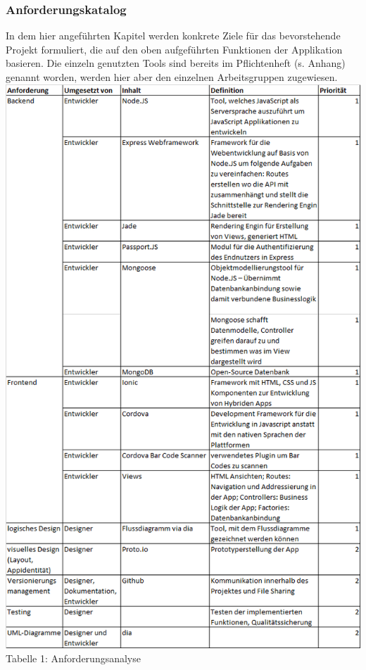 \documentclass[12pt,a4paper]{article}
\begin{document}
\subsubsection{Anforderungskatalog}
In dem hier angeführten Kapitel werden konkrete Ziele für das bevorstehende Projekt formuliert, die auf den oben aufgeführten Funktionen der Applikation basieren. Die einzeln genutzten Tools sind bereits im Pflichtenheft (s. Anhang) genannt worden, werden hier aber den einzelnen Arbeitsgruppen zugewiesen.
\includegraphics[scale=0.6, origin=l]{Anforderungskatalog.png}
\\
\footnotesize Tabelle 1: Anforderungsanalyse
\normalsize
\\
\linebreak
\end{document}
